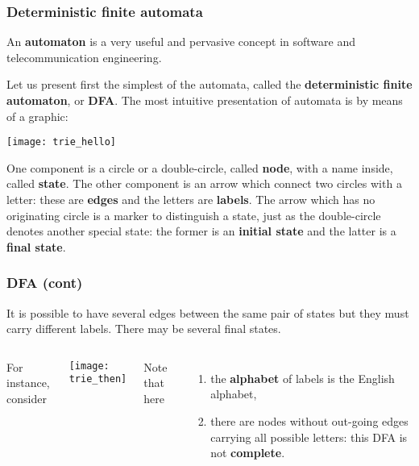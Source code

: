 
% 
\begin{frame}
\frametitle{Deterministic finite automata}
 
An \textbf{automaton} is a very useful and pervasive concept in
software and telecommunication engineering.

\bigskip

Let us present first the simplest of the automata, called the
\textbf{deterministic finite automaton}, or \textbf{DFA}. The most
intuitive presentation of automata is by means of a graphic:
\begin{center}
\texttt{[image: trie\_hello]}
\end{center}
One component is a circle or a double-circle, called \textbf{node},
with a name inside, called \textbf{state}. The other component is an
arrow which connect two circles with a letter: these are
\textbf{edges} and the letters are \textbf{labels}. The arrow which
has no originating circle is a marker to distinguish a state, just as
the double-circle denotes another special state: the former is an
\textbf{initial state} and the latter is a \textbf{final state}.

\end{frame}

% 
\begin{frame}
\frametitle{DFA (cont)}
 
\label{trie_then}

It is possible to have several edges between the same pair of states
but they must carry different labels. There may be several final
states.

\bigskip

\begin{columns}

   For instance, consider
  \begin{center}
    \texttt{[image: trie\_then]}
  \end{center}

   Note that here
  \begin{enumerate}

    \item the \textbf{alphabet} of labels is the English alphabet,

    \item there are nodes without out-going edges carrying all possible
    letters: this DFA is not \textbf{complete}.

  \end{enumerate}

\end{columns}

\end{frame}

